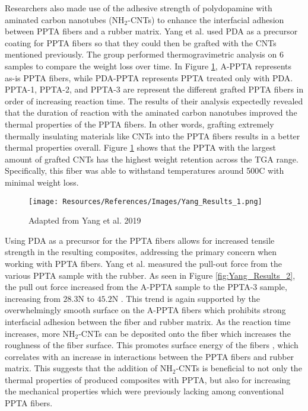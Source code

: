 \documentclass[12pt]{article}
\begin{document}
\begin{multicols}{2}
\indent Researchers also made use of the adhesive strength of polydopamine with aminated carbon nanotubes (NH$_2$-CNTs) to enhance the interfacial adhesion between PPTA fibers and a rubber matrix. Yang et al. \citep{Yang2019} used PDA as a precursor coating for PPTA fibers so that they could then be grafted with the CNTs mentioned previously. The group performed thermogravimetric analysis on 6 samples to compare the weight loss over time. In Figure \ref{fig:Yang_Results_1}, A-PPTA represents as-is PPTA fibers, while PDA-PPTA represents PPTA treated only with PDA. PPTA-1, PPTA-2, and PPTA-3 are represent the different grafted PPTA fibers in order of increasing reaction time. The results of their analysis expectedly revealed that the duration of reaction with the aminated carbon nanotubes improved the thermal properties of the PPTA fibers. In other words, grafting extremely thermally insulating materials like CNTs into the PPTA fibers results in a better thermal properties overall. Figure \ref{fig:Yang_Results_1} shows that the PPTA with the largest amount of grafted CNTs has the highest weight retention across the TGA range. Specifically, this fiber was able to withstand temperatures around 500\degree C with minimal weight loss. 

\begin{figure}[H]
    \centering
    \texttt{[image: Resources/References/Images/Yang\_Results\_1.png]}
    \caption{\scriptsize{Adapted from Yang et al. 2019 \citep{Yang2019}}}
    \label{fig:Yang_Results_1}
\end{figure}

\indent Using PDA as a precursor for the PPTA fibers allows for increased tensile strength in the resulting composites, addressing the primary concern when working with PPTA fibers. Yang et al. \citep{Yang2019} measured the pull-out force from the various PPTA sample with the rubber. As seen in Figure \ref{fig:Yang_Results_2}, the pull out force increased from the A-PPTA sample to the PPTA-3 sample, increasing from $28.3$N to $45.2$N \citep{Yang2019}. This trend is again supported by the overwhelmingly smooth surface on the A-PPTA fibers which prohibits strong interfacial adhesion between the fiber and rubber matrix. As the reaction time increases, more NH$_2$-CNTs can be deposited onto the fiber which increases the roughness of the fiber surface. This promotes surface energy of the fibers \citep{Yang2019}, which correlates with an increase in interactions between the PPTA fibers and rubber matrix. This suggests that the addition of NH$_2$-CNTs is beneficial to not only the thermal properties of produced composites with PPTA, but also for increasing the mechanical properties which were previously lacking among conventional PPTA fibers.


\end{multicols}
\end{document}
